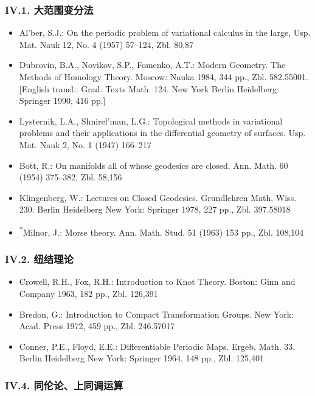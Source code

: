 \subsubsection*{IV.1. 大范围变分法}

\begin{itemize}
\item Al'ber, S.J.: On the periodic problem of variational calculus in the large, Usp. Mat. Nauk 12, No. 4 (1957) 57--124, Zbl. 80,87
\item Dubrovin, B.A., Novikov, S.P., Fomenko, A.T.: Modern Geometry. The Methods of Homology Theory. Moscow: Nauka 1984, 344 pp., Zbl. 582.55001. [English transl.: Grad. Texts Math. 124. New York Berlin Heidelberg: Springer 1990, 416 pp.]
\item Lysternik, L.A., Shnirel'man, L.G.: Topological methods in variational problems and their applications in the differential geometry of surfaces. Usp. Mat. Nauk 2, No. 1 (1947) 166--217
\item Bott, R.: On manifolds all of whose geodesics are closed. Ann. Math. 60 (1954) 375--382, Zbl. 58,156
\item Klingenberg, W.: Lectures on Closed Geodesics. Grundlehren Math. Wiss. 230. Berlin Heidelberg New York: Springer 1978, 227 pp., Zbl. 397.58018
\item \textsuperscript{*}Milnor, J.: Morse theory. Ann. Math. Stud. 51 (1963) 153 pp., Zbl. 108,104
\end{itemize}

\subsubsection*{IV.2. 纽结理论}

\begin{itemize}
\item Crowell, R.H., Fox, R.H.: Introduction to Knot Theory. Boston: Ginn and Company 1963, 182 pp., Zbl. 126,391
\item Bredon, G.: Introduction to Compact Transformation Groups. New York: Acad. Press 1972, 459 pp., Zbl. 246.57017
\item Conner, P.E., Floyd, E.E.: Differentiable Periodic Maps. Ergeb. Math. 33. Berlin Heidelberg New York: Springer 1964, 148 pp., Zbl. 125,401
\end{itemize}

\subsubsection*{IV.4. 同伦论、上同调运算}

